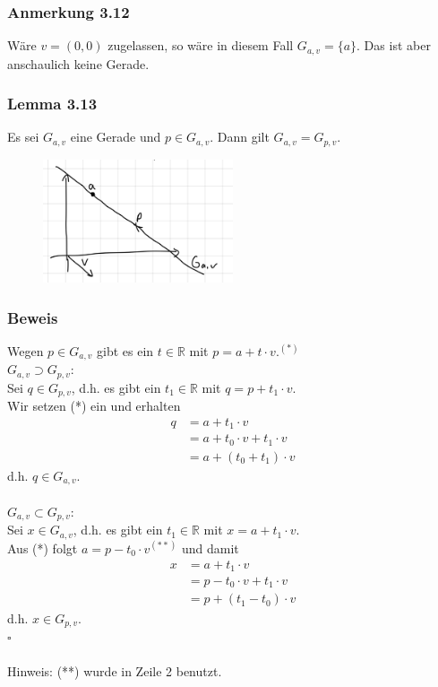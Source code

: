 \documentclass{article}
\begin{document}
\subsubsection*{Anmerkung 3.12}
Wäre $v=(0,0)$ zugelassen, so wäre in diesem Fall $G_{a,v} = \{a\}$. Das ist aber anschaulich keine Gerade. \\

\subsubsection*{Lemma 3.13}
Es sei $G_{a,v}$ eine Gerade und $p \in G_{a,v}$. Dann gilt $G_{a,v} = G_{p,v}$. \\
\begin{figure}[h]
    \centering
    \includegraphics[width=0.5\textwidth]{Images/3.13.jpeg}
    \caption{}
\end{figure}

\subsubsection*{Beweis}
Wegen $p \in G_{a,v}$ gibt es ein $t \in \mathbb{R}$ mit $p = a + t \cdot v.^{(*)}$
\\
\underline{\textit{$G_{a,v} \supset G_{p,v}$}}: \\
Sei $q \in G_{p,v}$, d.h. es gibt ein $t_1 \in \mathbb{R}$ mit $q = p + t_1 \cdot v$. \\
Wir setzen (*) ein und erhalten \\
\begin{align*}
    q &= a + t_1 \cdot v \\
    &= a + t_0 \cdot v + t_1 \cdot v \\
    &= a + (t_0 + t_1) \cdot v
\end{align*}
d.h. $q \in G_{a,v}$. \\
\\
\underline{\textit{$G_{a,v} \subset G_{p,v}$}}: \\
Sei $x \in G_{a,v}$, d.h. es gibt ein $t_1 \in \mathbb{R}$ mit $x = a + t_1 \cdot v$. \\
Aus (*) folgt $a=p-t_0 \cdot v^{(**)}$ und damit \\
\begin{align*}
    x &= a + t_1 \cdot v \\
    &= p - t_0 \cdot v + t_1 \cdot v \\
    &= p + (t_1 - t_0) \cdot v
\end{align*}
d.h. $x \in G_{p,v}$. \\
$\square$ \\
\\
Hinweis: (**) wurde in Zeile 2 benutzt. \\
\\
\end{document}
